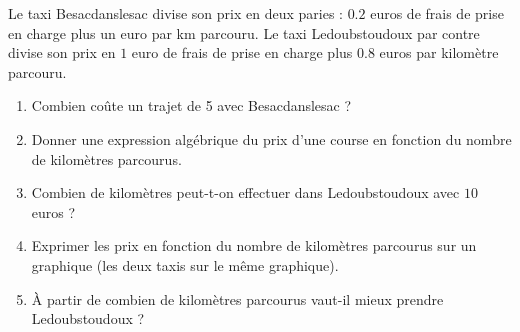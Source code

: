 
    Le taxi Besacdanslesac divise son prix en deux paries : $0.2$ euros de frais de prise en charge plus un euro par km parcouru. Le taxi Ledoubstoudoux par contre divise son prix en $1$ euro de frais de prise en charge plus $0.8$ euros par kilomètre parcouru.

    \begin{enumerate}
        \item
            Combien coûte un trajet de \unit{5}{\kilo\meter} avec Besacdanslesac ?
        \item
            Donner une expression algébrique du prix d'une course en fonction du nombre de kilomètres parcourus.
        \item
            Combien de kilomètres peut-t-on effectuer dans Ledoubstoudoux avec \( 10\) euros ?
        \item
            Exprimer les prix en fonction du nombre de kilomètres parcourus sur un graphique (les deux taxis sur le même graphique).
        \item
            À partir de combien de kilomètres parcourus vaut-il mieux prendre Ledoubstoudoux ?
    \end{enumerate}


